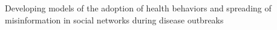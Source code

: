 \begin{cventries}
\begin{cventries}
{\begin{cvitems}
{        %
        }
      	\item {Developing models of the adoption of health behaviors and spreading of misinformation in social networks during disease outbreaks}
    \end{cvitems}     
    }
\vspace{-0.5mm}


\end{cventries}
\end{cventries}
